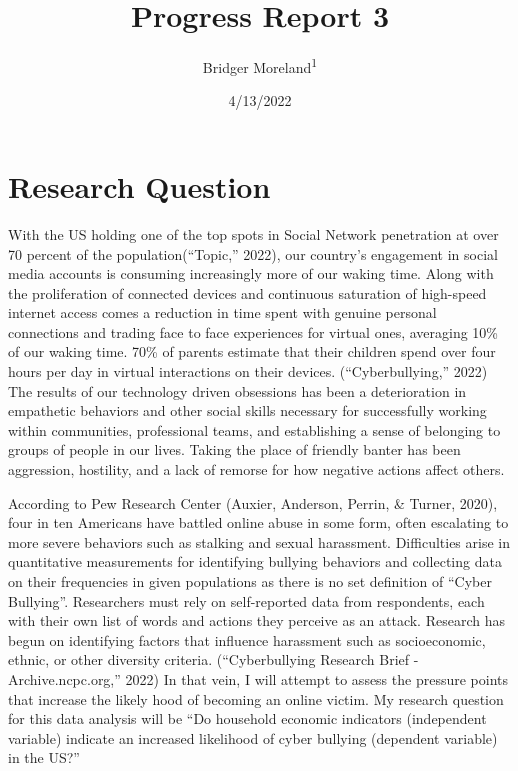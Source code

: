 \documentclass[
  man,LLO-8200, Introduction to Data Science]{apa6}
\title{Progress Report 3}
\author{Bridger Moreland\textsuperscript{1}}
\date{4/13/2022}
\affiliation{\vspace{0.5cm}\textsuperscript{1} Vanderbilt University, Peabody College}
\begin{document}
\maketitle

\hypertarget{research-question}{%
\section{Research Question}\label{research-question}}

With the US holding one of the top spots in Social Network penetration at over 70 percent of the population({``Topic,''} 2022), our country's engagement in social media accounts is consuming increasingly more of our waking time. Along with the proliferation of connected devices and continuous saturation of high-speed internet access comes a reduction in time spent with genuine personal connections and trading face to face experiences for virtual ones, averaging 10\% of our waking time. 70\% of parents estimate that their children spend over four hours per day in virtual interactions on their devices. ({``Cyberbullying,''} 2022) The results of our technology driven obsessions has been a deterioration in empathetic behaviors and other social skills necessary for successfully working within communities, professional teams, and establishing a sense of belonging to groups of people in our lives. Taking the place of friendly banter has been aggression, hostility, and a lack of remorse for how negative actions affect others.

According to Pew Research Center (Auxier, Anderson, Perrin, \& Turner, 2020), four in ten Americans have battled online abuse in some form, often escalating to more severe behaviors such as stalking and sexual harassment. Difficulties arise in quantitative measurements for identifying bullying behaviors and collecting data on their frequencies in given populations as there is no set definition of ``Cyber Bullying''. Researchers must rely on self-reported data from respondents, each with their own list of words and actions they perceive as an attack. Research has begun on identifying factors that influence harassment such as socioeconomic, ethnic, or other diversity criteria. ({``Cyberbullying Research Brief - Archive.ncpc.org,''} 2022) In that vein, I will attempt to assess the pressure points that increase the likely hood of becoming an online victim. My research question for this data analysis will be ``Do household economic indicators (independent variable) indicate an increased likelihood of cyber bullying (dependent variable) in the US?''
\end{document}
